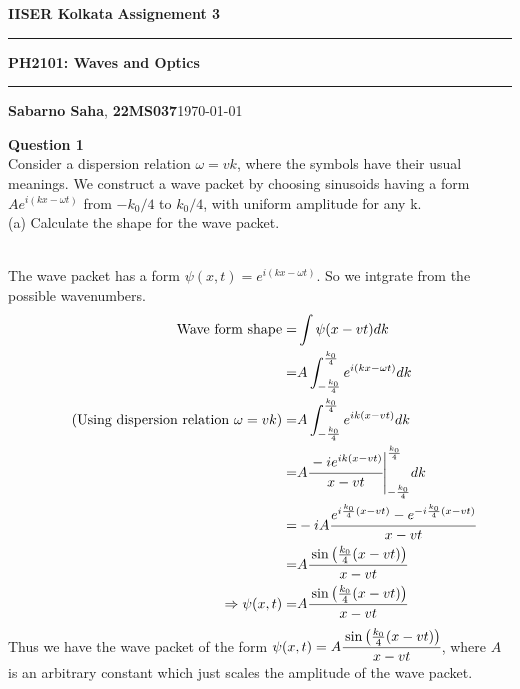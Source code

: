 \documentclass[addpoints]{exam}
\newcommand{\AssignmentName}{Assignement 3}
\newcommand{\subjectcode}{PH2101}
\begin{document}
\par\textbf{IISER Kolkata} \hfill \textbf{\AssignmentName}
\vspace{3pt}
\hrule
\vspace{3pt}
\begin{center}
        \LARGE{\textbf{\subjectcode : Waves and Optics}}
\end{center}
\vspace{3pt}

\hrule
\vspace{4pt}
\textbf{Sabarno Saha}, \textbf{22MS037}\hfill \today

\vspace{20pt}

\bigskip

\begin{questions}

\question \textbf{ Question 1}\\
Consider a dispersion relation $\omega = vk$, where the symbols have their usual meanings. We
construct a wave packet by choosing sinusoids having a form $Ae^{i(kx-\omega t)}$ from $-k_0/4$
to $k_0/4$, with uniform amplitude for any k.\\
(a) Calculate the shape for the wave packet.

\begin{solution}\\
    The wave packet has a form $\psi(x,t)=e^{i(kx-\omega t)}$. So we intgrate from the possible wavenumbers.
    \begin{align*}
        \text{Wave form shape} =& \int \psi(x-vt) dk\\ 
        =& A\int_{-\frac{k_0}{4}}^{\frac{k_0}{4}} e^{i(kx-\omega t)} dk \\ 
        \tag{Using dispersion relation $\omega = vk$}
        =& A\int_{-\frac{k_0}{4}}^{\frac{k_0}{4}} e^{ik(x-vt)}dk \\ 
        =& A\cfrac{-ie^{ik(x-v t)}}{x-vt}\Bigg|_{-\frac{k_0}{4}}^{\frac{k_0}{4}}  dk \\ 
        =& -iA\cfrac{e^{i\frac{k_0}{4}(x- vt)} - e^{-i\frac{k_0}{4}(x- vt)}}{x-vt}\\ 
        =& A\cfrac{\sin\qty(\frac{k_0}{4}(x-vt))}{x-vt} \\ 
        \Rightarrow\psi(x,t)=& A\cfrac{\sin\qty(\frac{k_0}{4}(x-vt))}{x-vt} \\ 
    \end{align*}
    Thus we have the wave packet of the form $\psi(x,t)= A\cfrac{\sin\qty(\frac{k_0}{4}(x-vt))}{x-vt}$, where
    $A$ is an arbitrary constant which just scales the amplitude of the wave packet.


\end{solution}
\end{questions}
\end{document}
